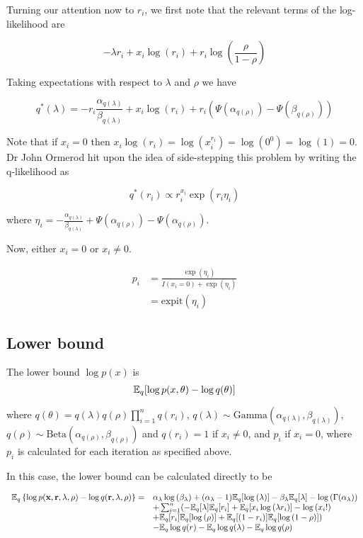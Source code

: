 \documentclass{amsart}
\begin{document}
Turning our attention now to $r_i$, we first note that the relevant terms of the
log-likelihood are

$$
-\lambda r_i + x_i \log{(r_i)} + r_i \log{\left(\frac{\rho}{1 - \rho}\right)}
$$

Taking expectations with respect to $\lambda$ and $\rho$ we have

$$
q^*(\lambda) = -r_i \frac{\alpha_{q(\lambda)}}{\beta_{q(\lambda)}} + x_i \log{(r_i)} + r_i (\Psi(\alpha_{q(\rho)}) - \Psi(\beta_{q(\rho)}))
$$

Note that if $x_i = 0$ then
$x_i \log{(r_i)} = \log{(x_i^{r_i})} = \log{(0^0)} = \log{(1)} = 0$. Dr John Ormerod hit
upon the idea of side-stepping this problem by writing the q-likelihood as

$$
q^*(r_i) \propto r_i^{x_i} \exp{(r_i \eta_i)}
$$

where $\eta_i = - \frac{\alpha_{q(\lambda)}}{\beta_{q(\lambda)}} + \Psi(\alpha_{q(\rho)}) - \Psi(\alpha_{q(\rho)})$.

Now, either $x_i = 0$ or $x_i \ne 0$.

$$
\begin{array}{ll}
p_i &= \frac{\exp{(\eta_i)}}{I(x_i = 0) + \exp{(\eta_i)}} \\
&= \text{expit}(\eta_i)
\end{array}
$$

\subsection{Lower bound}
The lower bound $\log{p(x)}$ is
$$
	{\mathbb E}_q[\log{p(x, \theta)} - \log{q(\theta)}]
$$

where $q(\theta) = q(\lambda) q(\rho) \prod_{i=1}^n q(r_i)$,
$q(\lambda) \sim \text{Gamma}{(\alpha_{q(\lambda)}, \beta_{q(\lambda)})}$,
$q(\rho) \sim \text{Beta}(\alpha_{q(\rho)}, \beta_{q(\rho)})$ and
$q(r_i) = 1$ if $x_i \ne 0$, and $p_i$ if $x_i = 0$, where $p_i$ is
calculated for each iteration as specified above.

In this case, the lower bound can be calculated directly to be

$$
\begin{array}{ll}
{\mathbb E}_q \left\{ \log{p({\bf x}, {\bf r}, \lambda, \rho)} - \log{q({\bf r}, \lambda, \rho)} \right\} =& 
\alpha_\lambda \log{(\beta_\lambda)} + (\alpha_\lambda - 1) {\mathbb E}_q[\log{(\lambda)}] - \beta_\lambda {\mathbb E}_q [\lambda] - \log{(\Gamma(\alpha_\lambda))} \\
&+ \sum_{i=1}^n ( -{\mathbb E}_q [\lambda] {\mathbb E}_q [r_i] + {\mathbb E}_q[x_i \log{(\lambda r_i)}] - \log{(x_i!)} \\
&+ {\mathbb E}_q[r_i] {\mathbb E}_q[\log{(\rho)}] + {\mathbb E}_q[(1 - r_i)] {\mathbb E}_q[\log{(1 - \rho)}] ) \\
& - {\mathbb E}_q \log{q(r)} - {\mathbb E}_q \log{q(\lambda)} - {\mathbb E}_q \log{q(\rho)}
\end{array}
$$
\end{document}

